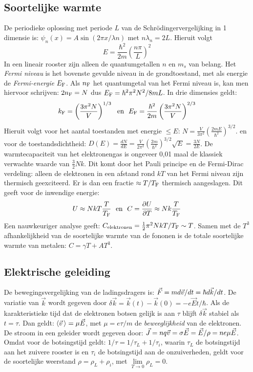\documentclass[twoside]{report}
\begin{document}
\subsection{Soortelijke warmte}
De periodieke oplossing met periode $L$ van de Schr\"odingervergelijking in
1 dimensie is:
$\psi_n(x)=A\sin(2\pi x/\lambda n)$ met $n\lambda_n=2L$. Hieruit volgt
\[
E=\frac{\hbar^2}{2m}\left(\frac{n\pi}{L}\right)^2
\]
In een lineair rooster zijn alleen de quantumgetallen $n$ en $m_s$ van
belang. Het {\em Fermi niveau} is het bovenste gevulde niveau in de
grondtoestand, met als energie de {\em Fermi-energie} $E_{\rm F}$. Als
$n_{\rm F}$ het quantumgetal van het Fermi niveau is, kan men hiervoor
schrijven: $2n_{\rm F}=N$ dus $E_{\rm F}=\hbar^2\pi^2 N^2/8mL$. In drie
dimensies geldt:
\[
k_{\rm F}=\left(\frac{3\pi^2N}{V}\right)^{1/3}~~\mbox{en}~~
E_{\rm F}=\frac{\hbar^2}{2m}\left(\frac{3\pi^2N}{V}\right)^{2/3}
\]
Hieruit volgt voor het aantal toestanden met energie $\leq E$:
$\displaystyle N=\frac{V}{3\pi^2}\left(\frac{2mE}{\hbar^2}\right)^{3/2}$.
\npar
en voor de toestandsdichtheid:
$\displaystyle D(E)=\frac{dN}{dE}=\frac{V}{2\pi^2}\left(\frac{2m}{\hbar^2}\right)^{3/2}
\sqrt{E}=\frac{3N}{2E}$.
\npar
De warmtecapaciteit van het elektronengas is ongeveer 0,01 maal de klassiek
verwachte waarde van $\frac{3}{2}Nk$. Dit komt door het Pauli principe en de
Fermi-Dirac verdeling: alleen de elektronen in een afstand rond $kT$ van het
Fermi niveau zijn thermisch geexciteerd. Er is dan een fractie
$\approx T/T_{\rm F}$ thermisch aangeslagen. Dit geeft voor de inwendige energie:
\[
U\approx NkT\frac{T}{T_{\rm F}}~~\mbox{en}~~C=\frac{\partial U}{\partial T}\approx Nk\frac{T}{T_{\rm F}}
\]
Een nauwkeuriger analyse geeft:
$C_{\rm elektronen}=\frac{1}{2}\pi^2NkT/T_{\rm F}\sim T$. Samen met de $T^3$
afhankelijkheid van de soortelijke warmte van de fononen is de totale
soortelijke warmte van metalen: $C=\gamma T+AT^3$.

\subsection{Elektrische geleiding}
De bewegingsvergelijking van de ladingsdragers is:
$\vec{F}=md\vec{v}/dt=\hbar d\vec{k}/dt$. De variatie van $\vec{k}$ wordt gegeven
door $\delta\vec{k}=\vec{k}(t)-\vec{k}(0)=-e\vec{E}t/\hbar$. Als de
karakteristieke tijd dat de elektronen botsen gelijk is aan $\tau$ blijft
$\delta\vec{k}$ stabiel als $t=\tau$. Dan geldt: $\left\langle \vec{v}\, \right\rangle=\mu\vec{E}$,
met $\mu=e\tau/m$ de {\it beweeglijkheid} van de elektronen.
\npar
De stroom in een geleider wordt gegeven door:
$\vec{J}=nq\vec{v}=\sigma\vec{E}=\vec{E}/\rho=ne\mu\vec{E}$. Omdat voor de
botsingstijd geldt: $1/\tau=1/\tau_L+1/\tau_i$, waarin $\tau_L$ de
botsingstijd aan het zuivere rooster is en $\tau_i$ de botsingstijd aan de
onzuiverheden, geldt voor de soortelijke weerstand $\rho=\rho_L+\rho_i$, met
$\lim\limits_{T\rightarrow 0}\rho_L=0$.
\end{document}
